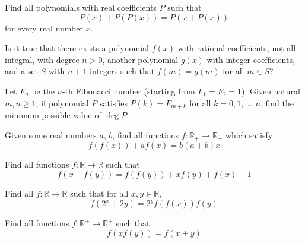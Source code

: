 


 {Find all polynomials with real coefficients $P$ such that
\[P(x) + P(P(x)) = P(x+P(x))\]
for every real number $x$.}

 {Is it true that there exists a polynomial $f(x)$ with rational coefficients, not all integral, with degree $n > 0$, another polynomial $g(x)$ with integer coefficients, and a set $S$ with $n+1$ integers such that $f(m) = g(m)$ for all $m \in S$?}

 {Let $F_n$ be the $n$-th Fibonacci number (starting from $F_1=F_2=1$). Given natural $m,n\ge 1$, if polynomial $P$ satisfies $P(k)=F_{m+k}$ for all $k=0,1,...,n$, find the minimum possible value of $\deg P$.}




 {Given some real numbers $a$, $b$, find all functions $f: \mathbb{R}_+\rightarrow\mathbb{R}_+$ which satisfy
\[f(f(x))+af(x)=b(a+b)x\]}

 {Find all functions $f: \mathbb{R}\rightarrow\mathbb{R}$ such that
\[f(x-f(y))=f(f(y))+xf(y)+f(x)-1\]}

 {Find all $f:\mathbb{R}\rightarrow \mathbb{R}$ such that for all $x,y\in\mathbb{R}$,
$$f(2^x+2y) = 2^yf(f(x))f(y)$$}




 {Find all functions $f: \mathbb{R^+}\rightarrow\mathbb{R^+}$ such that
\[f(xf(y)) = f(x+y)\]}




